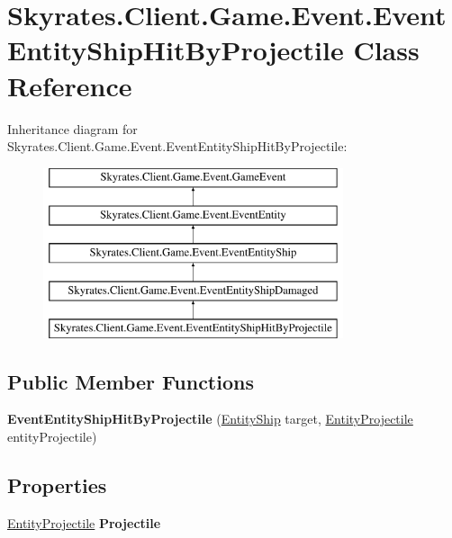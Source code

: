\hypertarget{class_skyrates_1_1_client_1_1_game_1_1_event_1_1_event_entity_ship_hit_by_projectile}{\section{Skyrates.\-Client.\-Game.\-Event.\-Event\-Entity\-Ship\-Hit\-By\-Projectile Class Reference}
\label{class_skyrates_1_1_client_1_1_game_1_1_event_1_1_event_entity_ship_hit_by_projectile}
}
Inheritance diagram for Skyrates.\-Client.\-Game.\-Event.\-Event\-Entity\-Ship\-Hit\-By\-Projectile\-:\begin{figure}[H]
\begin{center}
\leavevmode
\includegraphics[height=5.000000cm]{class_skyrates_1_1_client_1_1_game_1_1_event_1_1_event_entity_ship_hit_by_projectile}
\end{center}
\end{figure}
\subsection*{Public Member Functions}
\begin{DoxyCompactItemize}
\item 
\hypertarget{class_skyrates_1_1_client_1_1_game_1_1_event_1_1_event_entity_ship_hit_by_projectile_ac90a49bd0e6c20e2bbcbac31965fe013}{{\bfseries Event\-Entity\-Ship\-Hit\-By\-Projectile} (\hyperlink{class_skyrates_1_1_common_1_1_entity_1_1_entity_ship}{Entity\-Ship} target, \hyperlink{class_entity_projectile}{Entity\-Projectile} entity\-Projectile)}\label{class_skyrates_1_1_client_1_1_game_1_1_event_1_1_event_entity_ship_hit_by_projectile_ac90a49bd0e6c20e2bbcbac31965fe013}

\end{DoxyCompactItemize}
\subsection*{Properties}
\begin{DoxyCompactItemize}
\item 
\hypertarget{class_skyrates_1_1_client_1_1_game_1_1_event_1_1_event_entity_ship_hit_by_projectile_a278251a91678e0e27991998354e16455}{\hyperlink{class_entity_projectile}{Entity\-Projectile} {\bfseries Projectile}}\label{class_skyrates_1_1_client_1_1_game_1_1_event_1_1_event_entity_ship_hit_by_projectile_a278251a91678e0e27991998354e16455}

\end{DoxyCompactItemize}
